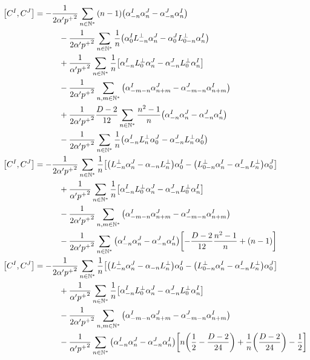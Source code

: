 \begin{align*}
    \comm{C^{I}}{C^{J}}&=-\frac{1}{2\alpha'{p^+}^2}\sum\limits_{n\in\mathbb N^\ast}\qty(n-1)\qty(\alpha^I_{-n}\alpha^J_n-\alpha^J_{-n}\alpha^I_n)\\
    &\quad\quad\quad-\frac{1}{2\alpha'{p^+}^2}\sum\limits_{n\in\mathbb N^\ast}\frac{1}{n}\qty(\alpha_{0}^IL^\perp_{-n}\alpha^J_n-\alpha^J_{0}L^\perp_{0-n}\alpha^I_n)\\
    &\quad\quad\quad+\frac{1}{ \alpha'{p^+}^2}\sum\limits_{n\in\mathbb N^\ast}\frac1n\qty[\alpha^I_{-n}L^\perp_{0}\alpha_n^J-\alpha^J_{-n}L^\perp_{0}\alpha_n^I]\\
    &\quad\quad\quad-\frac{1}{2\alpha'{p^+}^2}\sum\limits_{n,m\in\mathbb N^\ast}\left(\alpha^I_{-m-n}\alpha^J_{n+m}-\alpha^J_{-m-n}\alpha^I_{n+m}\right)\\
    &\quad\quad\quad+\frac{1}{2\alpha'{p^+}^2}\frac{D-2}{12}\sum\limits_{n\in\mathbb N^\ast}\frac{n^2-1}{n}\qty(\alpha^I_{-n}\alpha_n^J-\alpha^J_{-n}\alpha_n^I)\\
    &\quad\quad\quad-\frac{1}{2\alpha'{p^+}^2}\sum\limits_{n\in\mathbb N^\ast}\frac{1}{n}\qty(\alpha_{-n}^IL^\perp_{n}\alpha^J_{0}-\alpha_{-n}^JL^\perp_{n}\alpha^I_{0})\\
    \comm{C^{I}}{C^{J}}&=-\frac{1}{2\alpha'{p^+}^2}\sum\limits_{n\in\mathbb N^\ast}\frac{1}{n}\qty[\qty(L^\perp_{-n}\alpha^J_n-\alpha_{-n}L^\perp_n)\alpha_0^I-\qty(L^\perp_{0-n}\alpha^I_n-\alpha^I_{-n}L^\perp_n)\alpha^J_{0}]\\
    &\quad\quad\quad+\frac{1}{ \alpha'{p^+}^2}\sum\limits_{n\in\mathbb N^\ast}\frac1n\qty[\alpha^I_{-n}L^\perp_{0}\alpha_n^J-\alpha^J_{-n}L^\perp_{0}\alpha_n^I]\\
    &\quad\quad\quad-\frac{1}{2\alpha'{p^+}^2}\sum\limits_{n,m\in\mathbb N^\ast}\left(\alpha^I_{-m-n}\alpha^J_{n+m}-\alpha^J_{-m-n}\alpha^I_{n+m}\right)\\
    &\quad\quad\quad-\frac{1}{2\alpha'{p^+}^2}\sum\limits_{n\in\mathbb N^\ast}\qty(\alpha^I_{-n}\alpha^J_n-\alpha^J_{-n}\alpha^I_n)\qty[-\frac{D-2}{12}\frac{n^2-1}{n}+\qty(n-1)]\\
    \comm{C^{I}}{C^{J}}&=-\frac{1}{2\alpha'{p^+}^2}\sum\limits_{n\in\mathbb N^\ast}\frac{1}{n}\qty[\qty(L^\perp_{-n}\alpha^J_n-\alpha_{-n}L^\perp_n)\alpha_0^I-\qty(L^\perp_{0-n}\alpha^I_n-\alpha^I_{-n}L^\perp_n)\alpha^J_{0}]\\
    &\quad\quad\quad+\frac{1}{ \alpha'{p^+}^2}\sum\limits_{n\in\mathbb N^\ast}\frac1n\qty[\alpha^I_{-n}L^\perp_{0}\alpha_n^J-\alpha^J_{-n}L^\perp_{0}\alpha_n^I]\\
    &\quad\quad\quad-\frac{1}{2\alpha'{p^+}^2}\sum\limits_{n,m\in\mathbb N^\ast}\left(\alpha^I_{-m-n}\alpha^J_{n+m}-\alpha^J_{-m-n}\alpha^I_{n+m}\right)\\
    &\quad\quad\quad-\frac{1}{\alpha'{p^+}^2}\sum\limits_{n\in\mathbb N^\ast}\qty(\alpha^I_{-n}\alpha^J_n-\alpha^J_{-n}\alpha^I_n)\qty[n\qty(\frac12-\frac{D-2}{24})+\frac1n\qty(\frac{D-2}{24})-\frac12]
\end{align*}

